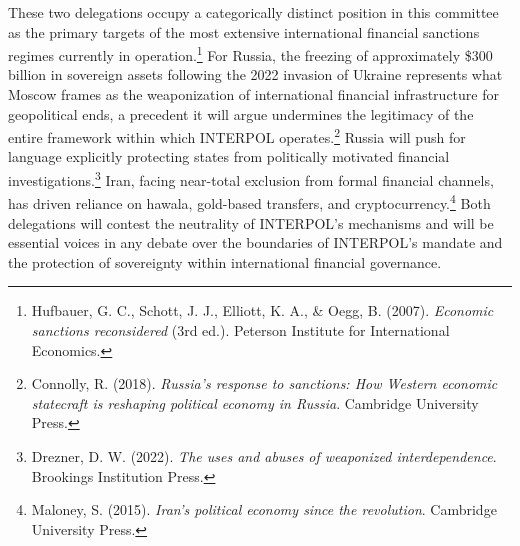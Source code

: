 These two delegations occupy a categorically distinct position in this committee as the primary targets of the most extensive international financial sanctions regimes currently in operation.\footnote{Hufbauer, G. C., Schott, J. J., Elliott, K. A., \& Oegg, B. (2007). \emph{Economic sanctions reconsidered} (3rd ed.). Peterson Institute for International Economics.} For Russia, the freezing of approximately \$300 billion in sovereign assets following the 2022 invasion of Ukraine represents what Moscow frames as the weaponization of international financial infrastructure for geopolitical ends, a precedent it will argue undermines the legitimacy of the entire framework within which INTERPOL operates.\footnote{Connolly, R. (2018). \emph{Russia's response to sanctions: How Western economic statecraft is reshaping political economy in Russia}. Cambridge University Press.} Russia will push for language explicitly protecting states from politically motivated financial investigations.\footnote{Drezner, D. W. (2022). \emph{The uses and abuses of weaponized interdependence}. Brookings Institution Press.} Iran, facing near-total exclusion from formal financial channels, has driven reliance on hawala, gold-based transfers, and cryptocurrency.\footnote{Maloney, S. (2015). \emph{Iran's political economy since the revolution}. Cambridge University Press.} Both delegations will contest the neutrality of INTERPOL's mechanisms and will be essential voices in any debate over the boundaries of INTERPOL's mandate and the protection of sovereignty within international financial governance.
